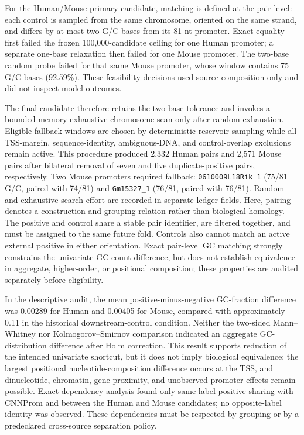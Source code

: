 For the Human/Mouse primary candidate, matching is defined at the pair level:
each control is sampled from the same chromosome, oriented on the same strand,
and differs by at most two G/C bases from its 81-nt promoter. Exact equality
first failed the frozen 100,000-candidate ceiling for one Human promoter; a
separate one-base relaxation then failed for one Mouse promoter. The two-base
random probe failed for that same Mouse promoter, whose window contains 75 G/C
bases (92.59\%). These feasibility decisions used source composition only and
did not inspect model outcomes.

The final candidate therefore retains the two-base tolerance and invokes a
bounded-memory exhaustive chromosome scan only after random exhaustion.
Eligible fallback windows are chosen by deterministic reservoir sampling while
all TSS-margin, sequence-identity, ambiguous-DNA, and control-overlap exclusions
remain active. This procedure produced 2,332 Human pairs and 2,571 Mouse pairs
after bilateral removal of seven and five duplicate-positive pairs,
respectively. Two Mouse promoters required fallback:
\texttt{0610009L18Rik\_1} (75/81 G/C, paired with 74/81) and
\texttt{Gm15327\_1} (76/81, paired with 76/81). Random and exhaustive search
effort are recorded in separate ledger fields.
Here, pairing denotes a construction and grouping relation rather than
biological homology. The positive and control share a stable pair identifier,
are filtered together, and must be assigned to the same future fold. Controls
also cannot match an active external positive in either orientation. Exact
pair-level GC matching strongly constrains the univariate GC-count difference,
but does not establish equivalence in aggregate, higher-order, or positional
composition; these properties are audited separately before eligibility.

In the descriptive audit, the mean positive-minus-negative GC-fraction
difference was 0.00289 for Human and 0.00405 for Mouse, compared with
approximately 0.11 in the historical downstream-control condition. Neither the
two-sided Mann--Whitney nor Kolmogorov--Smirnov comparison indicated an
aggregate GC-distribution difference after Holm correction. This result
supports reduction of the intended univariate shortcut, but it does not imply
biological equivalence: the largest positional nucleotide-composition
difference occurs at the TSS, and dinucleotide, chromatin, gene-proximity, and
unobserved-promoter effects remain possible. Exact dependency analysis found
only same-label positive sharing with CNNProm and between the Human and Mouse
candidates; no opposite-label identity was observed. These dependencies must
be respected by grouping or by a predeclared cross-source separation policy.

